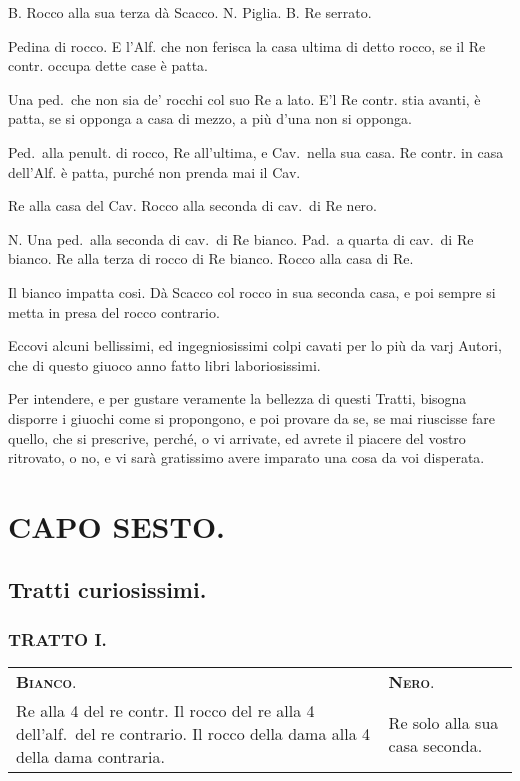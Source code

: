 \documentclass[11pt,a6paper]{article}
\begin{document}
B. Rocco alla sua terza dà Scacco. N. Piglia.
B. Re serrato.

Pedina di rocco. E l'Alf. che non ferisca
la casa ultima di detto rocco, se il Re contr.
occupa dette case è patta.

Una ped.\ che non sia de' rocchi col suo
Re a lato. E'l Re contr. stia avanti, è patta,
se si opponga a casa di mezzo, a più d'una
non si opponga.

Ped.\ alla penult. di rocco, Re all'ultima,
e Cav.\ nella sua casa. Re contr. in casa
dell'Alf. è patta, purché non prenda mai il Cav.

Re alla casa del Cav. Rocco alla seconda
di cav.\ di Re nero.

N. Una ped.\ alla seconda di cav.\ di Re
bianco. Pad.\ a quarta di cav.\ di Re bianco.
Re alla terza di rocco di Re bianco. Rocco
alla casa di Re.

Il bianco impatta cosi. Dà Scacco col rocco
in sua seconda casa, e poi sempre si metta
in presa del rocco contrario.

Eccovi alcuni bellissimi, ed ingegniosissimi
colpi cavati per lo più da varj Autori, che
di questo giuoco anno fatto libri laboriosissimi.

Per intendere, e per gustare veramente
la bellezza di questi Tratti, bisogna disporre
i giuochi come si propongono, e poi provare
da se, se mai riuscisse fare quello, che si
prescrive, perché, o vi arrivate, ed avrete il
piacere del vostro ritrovato, o no, e vi sarà
gratissimo avere imparato una cosa da voi
disperata.


\section{CAPO SESTO.}

\subsection{Tratti curiosissimi.}

\subsubsection{TRATTO I.}

{\small
\noindent
\begin{tabular}{@{}p{3.84cm}p{3.84cm}}
{\bfseries\scshape Bianco}.& {\bfseries\scshape Nero}.\\
Re alla 4 del re contr.
Il rocco del re alla 4 dell'alf.\ del re contrario.
Il rocco della dama alla
4 della dama contraria.& Re solo alla sua casa seconda.\\
\end{tabular}}
\end{document}
